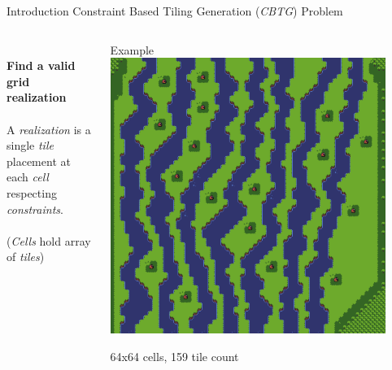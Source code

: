 \documentclass{beamer}
\begin{document}
  \begin{frame}[fragile]{Introduction}
    Constraint Based Tiling Generation (\textit{CBTG}) Problem
    \begin{columns}[T,onlytextwidth]
        \begin{block}{}
          \hfill \\
          \textbf{Find a valid grid realization}
          \hfill \\
          \hfill \\
          A \textit{realization} is a single \textit{tile} placement at each \textit{cell} \\
          respecting \textit{constraints}.
          \hfill \\
          \hfill \\
          (\textit{Cells} hold array of \textit{tiles})

        \end{block}
        \begin{block}{Example}
          \includegraphics[width=0.9\textwidth]{img/forestmicro_64x64.pdf}

          64x64 cells, 159 tile count
        \end{block}
    \end{columns}
  \end{frame}
\end{document}
